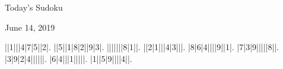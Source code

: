 \documentclass{article}
\begin{document}
\begin{center}
\Huge{Today's Sudoku}
\end{center}
\begin{center}
\Large{June 14, 2019}
\end{center}
\begin{sudoku}
||1|||4|7|5||2|.
||5||1|8|2||9|3|.
|||||||8|1||.
||2|1|||4|3|||.
|8|6|4||||9||1|.
|7|3|9|||||8||.
|3|9|2|4||||||.
|6|4|||1|||||.
|1||5|9||||4||.
\end{sudoku}
\end{document}
